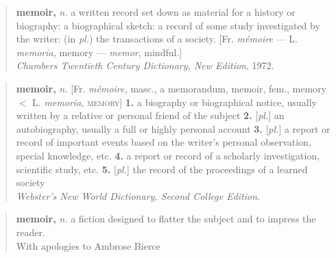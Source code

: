 \documentclass[10pt,a4paper,extrafontsizes]{memoir}
\begin{document}
\endgroup

\clearpage
\vspace*{\fill}
\begin{quote}
\textbf{memoir,} \textit{n.} a written record set down as material
  for a history or biography: 
  a biographical sketch:
  a record of some study investigated by the writer:
  (in \textit{pl.}) the transactions of a society.
  [Fr. \textit{m\'{e}moire} --- L. \textit{memoria,} memory ---
   \textit{memor}, mindful.] \\[0.5\baselineskip]
  \hspace*{\fill} 
      \textit{Chambers Twentieth Century Dictionary, New Edition}, 1972.
\end{quote}

\vspace{2\baselineskip}

\begin{quote}
\textbf{memoir,} \textit{n.} [Fr. \textit{m\'{e}moire,} masc., a memorandum,
    memoir, fem., memory $<$ L. \textit{memoria,} \textsc{memory}]
  \hspace{1ex} \textbf{1.} a biography or biographical notice, 
      usually written by a relative or personal friend of the subject 
  \hspace{1ex} \textbf{2.} [\textit{pl.}] an autobiography, 
      usually a full or highly personal account
  \hspace{1ex} \textbf{3.} [\textit{pl.}] a report or record of 
      important events based on the writer's personal observation, 
      special knowledge, etc.
  \hspace{1ex} \textbf{4.} a report or record of a scholarly 
      investigation, scientific study, etc.
  \hspace{1ex} \textbf{5.} [\textit{pl.}] the record of the proceedings
      of a learned society \\[0.5\baselineskip]
  \hspace*{\fill} \textit{Webster's New World Dictionary, Second College Edition}.
\end{quote}

\vspace{2\baselineskip}


\begin{quote}
\textbf{memoir,} \textit{n.} a fiction designed to flatter the subject 
  and to impress the reader. \\[0.5\baselineskip]
\hspace*{\fill} With apologies to Ambrose Bierce %
\end{quote}
\end{document}
